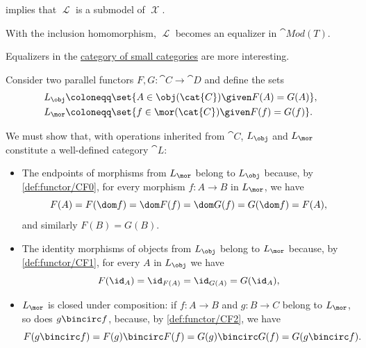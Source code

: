 \begin{example}
\begin{thmenum}
     implies that \( \mscrL \) is a submodel of \( \mscrX \).

    With the inclusion homomorphism, \( \mscrL \) becomes an equalizer in \( \cat{Mod}(T) \).

     Equalizers in the \hyperref[def:category_of_small_categories]{category of small categories} are more interesting.

    Consider two parallel functors \( F, G: \cat{C} \to \cat{D} \) and define the sets
    \begin{align*}
      L_{\obj} &\coloneqq \set{ A \in \obj(\cat{C}) \given F(A) = G(A) }, \\
      L_{\mor} &\coloneqq \set{ f \in \mor(\cat{C}) \given F(f) = G(f) }.
    \end{align*}

    We must show that, with operations inherited from \( \cat{C} \), \( L_{\obj} \) and \( L_{\mor} \) constitute a well-defined category \( \cat{L} \):
    \begin{itemize}
      \item The endpoints of morphisms from \( L_{\mor} \) belong to \( L_{\obj} \) because, by \ref{def:functor/CF0}, for every morphism \( f: A \to B \) in \( L_{\mor} \), we have
      \begin{equation*}
        F(A) = F(\dom f) = \dom F(f) = \dom G(f) = G(\dom f) = F(A),
      \end{equation*}
      and similarly \( F(B) = G(B) \).

      \item The identity morphisms of objects from \( L_{\obj} \) belong to \( L_{\mor} \) because, by \ref{def:functor/CF1}, for every \( A \) in \( L_{\obj} \) we have
      \begin{equation*}
        F(\id_A) = \id_{F(A)} = \id_{G(A)} = G(\id_A),
      \end{equation*}

      \item \( L_{\mor} \) is closed under composition: if \( f: A \to B \) and \( g: B \to C \) belong to \( L_{\mor} \), so does \( g \bincirc f \), because, by \ref{def:functor/CF2}, we have
      \begin{equation*}
        F(g \bincirc f) = F(g) \bincirc F(f) = G(g) \bincirc G(f) = G(g \bincirc f).
      \end{equation*}
    \end{itemize}


\end{thmenum}
\end{example}
